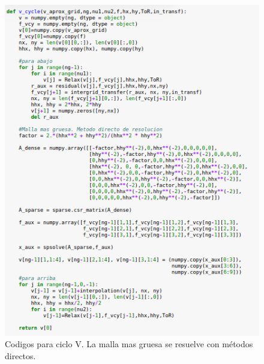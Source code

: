 \documentclass[letter,10pt]{article}
\begin{document}
\begin{figure}[H]
\centering
\includegraphics[scale=1.3]{img/vcyclecode}
\caption{Codigos para ciclo V. La malla mas gruesa se resuelve con métodos directos.}
\label{ciclovcode}
\end{figure}
\end{document}
